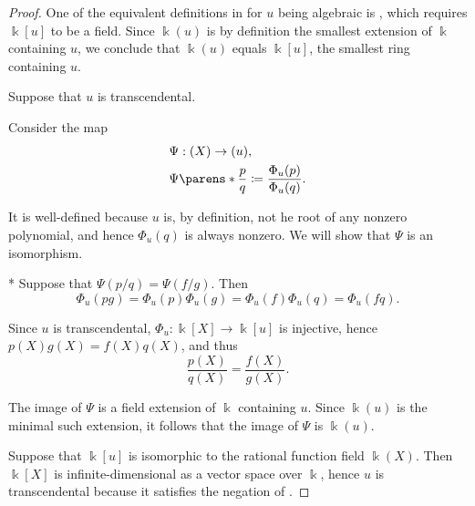\begin{proof}
   One of the equivalent definitions in  for \( u \) being algebraic is , which requires \( \Bbbk[u] \) to be a field. Since \( \Bbbk(u) \) is by definition the smallest extension of \( \Bbbk \) containing \( u \), we conclude that \( \Bbbk(u) \) equals \( \Bbbk[u] \), the smallest ring containing \( u \).


  \SufficiencySubProof* Suppose that \( u \) is transcendental.

  Consider the map
  \begin{equation*}
    \begin{aligned}
      &\Psi: \Bbbk(X) \to \Bbbk(u), \\
      &\Psi\parens*{ \frac p q } \coloneqq \frac {\Phi_u(p)} {\Phi_u(q)}.
    \end{aligned}
  \end{equation*}

  It is well-defined because \( u \) is, by definition, not he root of any nonzero polynomial, and hence \( \Phi_u(q) \) is always nonzero. We will show that \( \Psi \) is an isomorphism.

  * Suppose that \( \Psi(p / q) = \Psi(f / g) \). Then
  \begin{equation*}
    \Phi_u(pg) = \Phi_u(p) \Phi_u(g) = \Phi_u(f) \Phi_u(q) = \Phi_u(fq).
  \end{equation*}

  Since \( u \) is transcendental, \( \Phi_u: \Bbbk[X] \to \Bbbk[u] \) is injective, hence \( p(X) g(X) = f(X) q(X) \), and thus
  \begin{equation*}
    \frac {p(X)} {q(X)} = \frac {f(X)} {g(X)}.
  \end{equation*}

   The image of \( \Psi \) is a field extension of \( \Bbbk \) containing \( u \). Since \( \Bbbk(u) \) is the minimal such extension, it follows that the image of \( \Psi \) is \( \Bbbk(u) \).

  \NecessitySubProof* Suppose that \( \Bbbk[u] \) is isomorphic to the rational function field \( \Bbbk(X) \). Then \( \Bbbk[X] \) is infinite-dimensional as a vector space over \( \Bbbk \), hence \( u \) is transcendental because it satisfies the negation of .
\end{proof}

